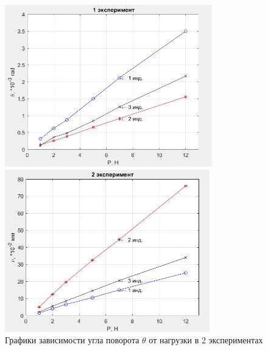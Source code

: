 \documentclass[12pt, a4paper]{article}
\begin{document}
\begin{figure}[h]
\begin{minipage}[h]{0.4\linewidth}
\centering
\includegraphics[width = 9cm]{teta_1.jpg}
\end{minipage}
\hfill
\begin{minipage}[h]{0.4\linewidth}
\centering
\includegraphics[width = 8.9cm]{nu_2.jpg}
\end{minipage}
\caption{Графики зависимости угла поворота $\theta$ от нагрузки в 2 экспериментах}
\end{figure}
\end{document}
